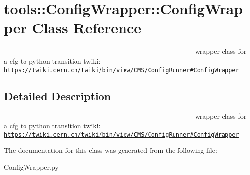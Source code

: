 \hypertarget{classtools_1_1ConfigWrapper_1_1ConfigWrapper}{
\section{tools::ConfigWrapper::ConfigWrapper Class Reference}
\label{classtools_1_1ConfigWrapper_1_1ConfigWrapper}
}
----------------------------------------------------------------------------------- wrapper class for a cfg to python transition twiki: \href{https://twiki.cern.ch/twiki/bin/view/CMS/ConfigRunner#ConfigWrapper}{\tt https://twiki.cern.ch/twiki/bin/view/CMS/ConfigRunner\#ConfigWrapper}  




\subsection{Detailed Description}
----------------------------------------------------------------------------------- wrapper class for a cfg to python transition twiki: \href{https://twiki.cern.ch/twiki/bin/view/CMS/ConfigRunner#ConfigWrapper}{\tt https://twiki.cern.ch/twiki/bin/view/CMS/ConfigRunner\#ConfigWrapper} 

The documentation for this class was generated from the following file:\begin{CompactItemize}
\item 
ConfigWrapper.py\end{CompactItemize}
